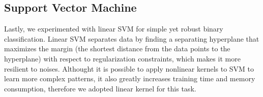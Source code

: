\documentclass[12pt,a4paper]{article}
\begin{document}
    
    



\subsection{Support Vector Machine}

Lastly, we experimented with linear SVM for simple yet robust binary classification. Linear SVM separates data by finding a separating hyperplane that maximizes the margin (the shortest distance from the data points to the hyperplane) with respect to regularization constraints, which makes it more resilient to noises. Althought it is possible to apply nonlinear kernels to SVM to learn more complex patterns, it also greatly increases training time and memory consumption, therefore we adopted linear kernel for this task.
\end{document}
